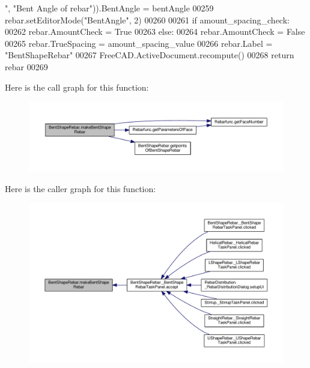 \begin{DoxyCode}
{      "}, \textcolor{stringliteral}{"Bent Angle of rebar"})).BentAngle = bentAngle
00259     rebar.setEditorMode(\textcolor{stringliteral}{"BentAngle"}, 2)
00260 
00261     \textcolor{keywordflow}{if} amount\_spacing\_check:
00262         rebar.AmountCheck = \textcolor{keyword}{True}
00263     \textcolor{keywordflow}{else}:
00264         rebar.AmountCheck = \textcolor{keyword}{False}
00265         rebar.TrueSpacing = amount\_spacing\_value
00266     rebar.Label = \textcolor{stringliteral}{"BentShapeRebar"}
00267     FreeCAD.ActiveDocument.recompute()
00268     \textcolor{keywordflow}{return} rebar
00269 
\end{DoxyCode}


Here is the call graph for this function\+:\nopagebreak
\begin{figure}[H]
\begin{center}
\leavevmode
\includegraphics[width=350pt]{namespaceBentShapeRebar_aac46779d3e1905db5a3788917f6e2476_cgraph}
\end{center}
\end{figure}




Here is the caller graph for this function\+:\nopagebreak
\begin{figure}[H]
\begin{center}
\leavevmode
\includegraphics[width=350pt]{namespaceBentShapeRebar_aac46779d3e1905db5a3788917f6e2476_icgraph}
\end{center}
\end{figure}




